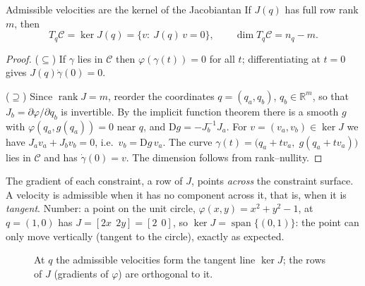 \documentclass[11pt,a4paper]{article}
\newcommand{\R}{\mathbb{R}}
\DeclareMathOperator{\rank}{rank}
\begin{document}
\begin{theorem}{Admissible velocities are the kernel of the Jacobian}{tan}
If $J(q)$ has full row rank $m$, then
\begin{equation}\label{eq:tan}
  T_q\mathcal C=\ker J(q)=\{v:\ J(q)\,v=0\},\qquad \dim T_q\mathcal C=n_q-m .
\end{equation}
\end{theorem}
\begin{proof}
($\subseteq$) If $\gamma$ lies in $\mathcal C$ then $\varphi(\gamma(t))=0$ for all $t$;
differentiating at $t=0$ gives $J(q)\dot\gamma(0)=0$.

($\supseteq$) Since $\rank J=m$, reorder the coordinates $q=(q_a,q_b)$, $q_b\in\R^m$, so that
$J_b=\partial\varphi/\partial q_b$ is invertible. By the implicit function theorem there is a
smooth $g$ with $\varphi(q_a,g(q_a))=0$ near $q$, and $\mathrm Dg=-J_b^{-1}J_a$. For
$v=(v_a,v_b)\in\ker J$ we have $J_a v_a+J_b v_b=0$, i.e.\ $v_b=\mathrm Dg\,v_a$. The curve
$\gamma(t)=\big(q_a+t v_a,\;g(q_a+t v_a)\big)$ lies in $\mathcal C$ and has $\dot\gamma(0)=v$.
The dimension follows from rank--nullity.
\end{proof}

\begin{intuition}
The gradient of each constraint, a row of $J$, points \emph{across} the constraint surface.
A velocity is admissible when it has no component across it, that is, when it is
\emph{tangent}. Number: a point on the unit circle, $\varphi(x,y)=x^2+y^2-1$, at
$q=(1,0)$ has $J=[2x\ \ 2y]=[2\ \ 0]$, so $\ker J=\operatorname{span}\{(0,1)\}$: the point can
only move vertically (tangent to the circle), exactly as expected.
\end{intuition}

\begin{figure}[ht]
\centering
{}
\caption{At $q$ the admissible velocities form the tangent line $\ker J$; the rows of $J$ (gradients of $\varphi$) are orthogonal to it.}
\end{figure}
\end{document}
